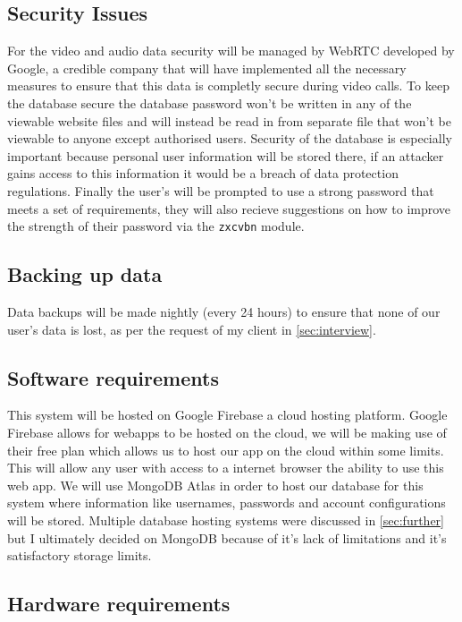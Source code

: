 \subsection{Security Issues}

For the video and audio data security will be managed by 
WebRTC developed by Google, a credible company that will have
implemented all the necessary measures to ensure that this
data is completly secure during video calls. To keep the 
database secure the database password won't be written in any
of the viewable website files and will instead be read in from
separate file that won't be viewable to anyone except 
authorised users. Security of the database is especially 
important because personal user information will be stored 
there, if an attacker gains access to this information it 
would be a breach of data protection regulations. Finally 
the user's will be prompted to use a strong password that 
meets a set of requirements, they will also recieve 
suggestions on how to improve the strength of their password
via the \texttt{zxcvbn} module.

\subsection{Backing up data}

Data backups will be made nightly (every 24 hours) to ensure
that none of our user's data is lost, as per the request of
my client in \ref{sec:interview}.

\subsection{Software requirements}

This system will be hosted on Google Firebase a cloud hosting
platform. Google Firebase allows for webapps to be hosted on 
the cloud, we will be making use of their free plan which 
allows us to host our app on the cloud within some limits. 
This will allow any user with access to a internet
browser the ability to use this web app. We will use MongoDB
Atlas in order to host our database for this system where 
information like usernames, passwords and account
configurations will be stored. Multiple database hosting 
systems were discussed in \ref{sec:further} but I ultimately 
decided on MongoDB because of it's lack of limitations and 
it's satisfactory storage limits.

\subsection{Hardware requirements}
\label{sec:hardware}

